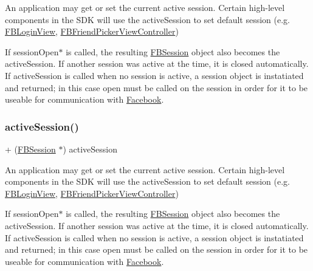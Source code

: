 An application may get or set the current active session. Certain high-\/level components in the S\+DK will use the active\+Session to set default session (e.\+g. {\ttfamily \hyperlink{interfaceFBLoginView}{F\+B\+Login\+View}}, {\ttfamily \hyperlink{interfaceFBFriendPickerViewController}{F\+B\+Friend\+Picker\+View\+Controller}})

If session\+Open$\ast$ is called, the resulting {\ttfamily \hyperlink{interfaceFBSession}{F\+B\+Session}} object also becomes the active\+Session. If another session was active at the time, it is closed automatically. If active\+Session is called when no session is active, a session object is instatiated and returned; in this case open must be called on the session in order for it to be useable for communication with \hyperlink{interfaceFacebook}{Facebook}. \mbox{\label{interfaceFBSession_aaf6863ab39e2f67733792453874d3870}} 
\subsubsection{\texorpdfstring{active\+Session()}{activeSession()}\hspace{0.1cm}{\footnotesize\ttfamily [3/5]}}
{\footnotesize\ttfamily + (\hyperlink{interfaceFBSession}{F\+B\+Session} $\ast$) active\+Session \begin{DoxyParamCaption}{ }\end{DoxyParamCaption}}

An application may get or set the current active session. Certain high-\/level components in the S\+DK will use the active\+Session to set default session (e.\+g. {\ttfamily \hyperlink{interfaceFBLoginView}{F\+B\+Login\+View}}, {\ttfamily \hyperlink{interfaceFBFriendPickerViewController}{F\+B\+Friend\+Picker\+View\+Controller}})

If session\+Open$\ast$ is called, the resulting {\ttfamily \hyperlink{interfaceFBSession}{F\+B\+Session}} object also becomes the active\+Session. If another session was active at the time, it is closed automatically. If active\+Session is called when no session is active, a session object is instatiated and returned; in this case open must be called on the session in order for it to be useable for communication with \hyperlink{interfaceFacebook}{Facebook}. \mbox{\label{interfaceFBSession_aaf6863ab39e2f67733792453874d3870}} 
